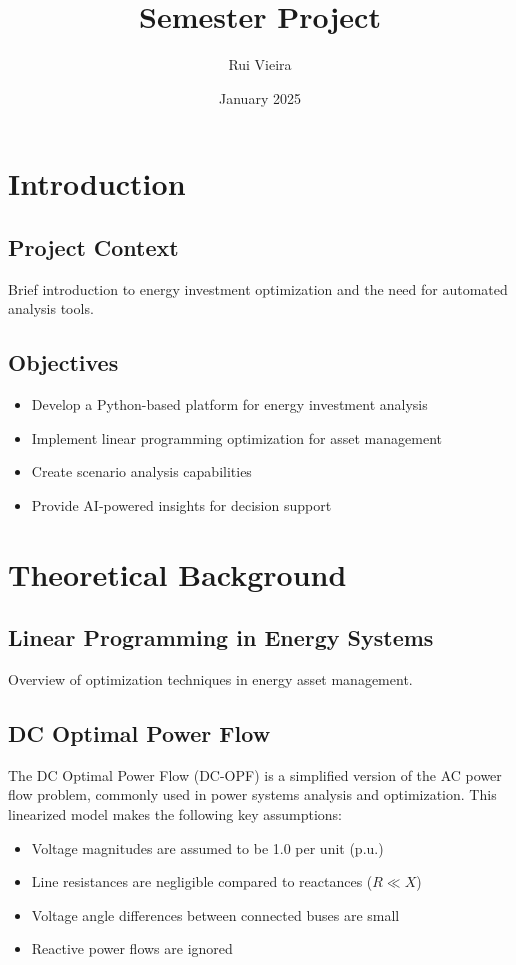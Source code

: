 \documentclass{article}
\title{Semester Project}
\author{Rui Vieira}
\date{January 2025}
\begin{document}

\tableofcontents
\newpage

\section{Introduction}
\subsection{Project Context}
Brief introduction to energy investment optimization and the need for automated analysis tools.

\subsection{Objectives}
\begin{itemize}
    \item Develop a Python-based platform for energy investment analysis
    \item Implement linear programming optimization for asset management
    \item Create scenario analysis capabilities
    \item Provide AI-powered insights for decision support
\end{itemize}
\newpage

\section{Theoretical Background}
\subsection{Linear Programming in Energy Systems}
Overview of optimization techniques in energy asset management.

\subsection{DC Optimal Power Flow}
The DC Optimal Power Flow (DC-OPF) is a simplified version of the AC power flow problem, commonly used in power systems analysis and optimization. This linearized model makes the following key assumptions:

\begin{itemize}
    \item Voltage magnitudes are assumed to be 1.0 per unit (p.u.)
    \item Line resistances are negligible compared to reactances ($R \ll X$)
    \item Voltage angle differences between connected buses are small
    \item Reactive power flows are ignored
\end{itemize}
\end{document}

